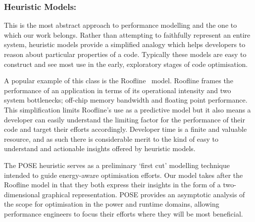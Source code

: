 \subsubsection{Heuristic Models:}
This is the most abstract approach to performance modelling and the one to which our work belongs.
Rather than attempting to faithfully represent an entire system, heuristic models provide a simplified analogy which helps developers to reason about particular properties of a code.
Typically these models are easy to construct and see most use in the early, exploratory stages of code optimisation. 

A popular example of this class is the Roofline~\cite{williams:2009aa} model.
Roofline frames the performance of an application in terms of its operational intensity and two system bottlenecks; off-chip memory bandwidth and floating point performance.
This simplification limits Roofline's use as a predictive model but it also means a developer can easily understand the limiting factor for the performance of their code and target their efforts accordingly.
Developer time is a finite and valuable resource, and as such there is considerable merit to the kind of easy to understand and actionable insights offered by heuristic models.

The POSE heuristic serves as a preliminary `first cut' modelling technique intended to guide energy-aware optimisation efforts.
Our model takes after the Roofline model in that they both express their insights in the form of a two-dimensional graphical representation.
POSE provides an asymptotic analysis of the scope for optimisation in the power and runtime domains, allowing performance engineers to focus their efforts where they will be most beneficial.
